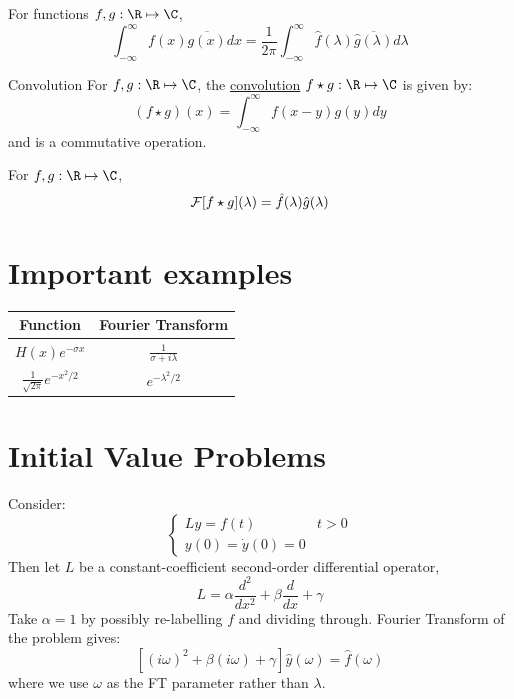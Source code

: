 \documentclass[../Main.tex]{subfiles}
\begin{document}
\begin{proposition}
    For functions $f, g : \R\mapsto\C$,
    \begin{equation*}
        \int_{-\infty}^{\infty} f(x)\overline{g(x)} dx = \frac1{2\pi} \int_{-\infty}^{\infty} \hat{f}(\lambda)\overline{\hat{g}(\lambda)} d\lambda
    \end{equation*}
    \label{thmParsevalFT}
\end{proposition}
\begin{definition}{Convolution}
    For $f, g : \R\mapsto\C$, the \underline{convolution} $f \star g : \R \mapsto \C$ is given by:
    \begin{equation*}
        (f \star g)(x) = \int_{-\infty}^{\infty} f(x - y)g(y) dy 
    \end{equation*}
    and is a commutative operation.
\end{definition}
\begin{theorem}
    For $f, g : \R\mapsto\C$,
    \begin{equation*}
        \mathcal{F}[f \star g](\lambda) = \hat{f}(\lambda) \hat{g}(\lambda)
    \end{equation*}
    \label{thmFTConvolution}
\end{theorem}
\section{Important examples}
\begin{tabular}{|c|c|}
    \hline
    Function & Fourier Transform \\
    \hline
    $H(x) e^{-\sigma x}$ & $\frac{1}{\sigma + i \lambda}$ \\
    $\frac{1}{\sqrt{2\pi}}e^{-x^2 / 2}$ & $e^{-\lambda^2 / 2}$ \\
    \hline
\end{tabular}
\section{Initial Value Problems}
Consider:
\begin{equation*}
    \begin{cases}
        Ly = f(t) & t > 0 \\
        y(0) = \dot{y}(0) = 0 &
    \end{cases}
\end{equation*}
Then let $L$ be a constant-coefficient second-order differential operator,
\begin{equation*}
    L = \alpha \frac{d^{2}}{dx^{2}} + \beta \frac{d}{dx} + \gamma
\end{equation*}
Take $\alpha = 1$ by possibly re-labelling $f$ and dividing through. Fourier Transform of the problem gives:
\begin{equation*}
    \left[(i\omega)^2 + \beta(i\omega) + \gamma\right]\hat{y}(\omega) = \hat{f}(\omega)
\end{equation*}
where we use $\omega$ as the FT parameter rather than $\lambda$.
\end{document}

